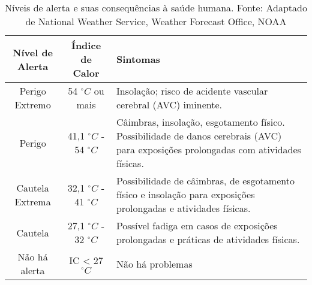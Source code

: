 \begin{table}[h!]
  \caption{Níveis de alerta e suas consequências à saúde humana. Fonte: Adaptado de National Weather Service, Weather Forecast Office, NOAA} \label{tab:indiceCalor}
  \centering
\begin{tabular}{ccp{7cm}}
 \toprule
 \textbf{Nível de Alerta} & \textbf{Índice de Calor} & \textbf{Sintomas}\\
 \midrule
Perigo Extremo & 54 $^{\circ}C$ ou mais & Insolação; risco de acidente vascular cerebral (AVC) iminente.\\
Perigo & 41,1 $^{\circ}C$ - 54 $^{\circ}C$  & Câimbras, insolação, esgotamento físico. Possibilidade de danos cerebrais (AVC) para exposições prolongadas com atividades físicas.\\
Cautela Extrema & 32,1 $^{\circ}C$ - 41 $^{\circ}C$ & Possibilidade de câimbras, de esgotamento físico e insolação para exposições prolongadas e atividades físicas.\\
Cautela & 27,1 $^{\circ}C$ - 32 $^{\circ}C$ & Possível fadiga em casos de exposições prolongadas e práticas de atividades físicas.\\
Não há alerta & IC < 27 $^{\circ}C$ & Não há problemas\\
\bottomrule
\end{tabular}
\end{table}